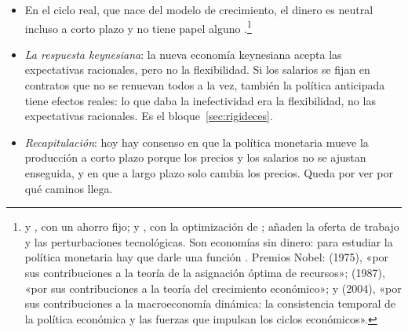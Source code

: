 \documentclass[11pt]{article}
\begin{document}
\begin{itemize}
\item En el ciclo real, que nace del modelo de crecimiento, el dinero es neutral incluso a corto plazo y no tiene papel alguno .\footnote{\textcite{Solow1956} y \textcite{Swan1956}, con un ahorro fijo; \textcite{Cass1965} y \textcite{Koopmans1965}, con la optimización de \textcite{Ramsey1928}; \textcite{KydlandPrescott1982Time} añaden la oferta de trabajo y las perturbaciones tecnológicas. Son economías sin dinero: para estudiar la política monetaria hay que darle una función . Premios Nobel:  (1975), «por sus contribuciones a la teoría de la asignación óptima de recursos»\nocite{NobelPrize1975Koopmans};  (1987), «por sus contribuciones a la teoría del crecimiento económico»\nocite{Nobel1987Solow};  y  (2004), «por sus contribuciones a la macroeconomía dinámica: la consistencia temporal de la política económica y las fuerzas que impulsan los ciclos económicos»\nocite{Nobel2004KydlandPrescott}.}
\end{itemize}

\begin{itemize}
\item \emph{La respuesta keynesiana}: la nueva economía keynesiana acepta las expectativas racionales, pero no la flexibilidad. Si los salarios se fijan en contratos que no se renuevan todos a la vez, también la política anticipada tiene efectos reales\nocite{Fischer1977Long,Taylor1980Aggregate}: lo que daba la inefectividad era la flexibilidad, no las expectativas racionales. Es el bloque~\ref{sec:rigideces}.
\item \emph{Recapitulación}: hoy hay consenso en que la política monetaria mueve la producción a corto plazo porque los precios y los salarios no se ajustan enseguida, y en que a largo plazo solo cambia los precios. Queda por ver por qué caminos llega.
\end{itemize}
\end{document}
